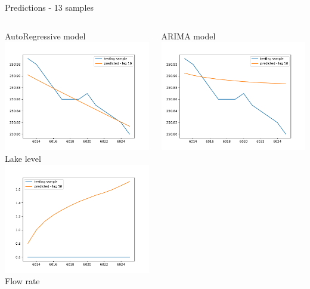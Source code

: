 \documentclass[aspectratio=169, glossy]{beamer}
\begin{document}

\begin{frame}{Predictions - 13 samples}
  \begin{columns}
    \begin{column}{0.5\columnwidth}
      \begin{center}
        \vspace{-1em}
        AutoRegressive model\\
        \vspace{0.5em}
        \includegraphics[width=0.5\columnwidth]{../plots/ar_lake_level_prediction.pdf}\\
        \tiny{Lake level}\\
        \vspace{0.5em}
        \includegraphics[width=0.5\columnwidth]{../plots/ar_flow_rate_prediction.pdf}\\
        \tiny{Flow rate}
      \end{center}
    \end{column}
    \begin{column}{0.5\columnwidth}
      \begin{center}
        \vspace{-1em}
        ARIMA model\\
        \vspace{0.5em}
        \includegraphics[width=0.5\columnwidth]{../plots/arima_lake_level_prediction.pdf}\\

\end{center}
\end{column}
\end{columns}
\end{frame}
\end{document}
